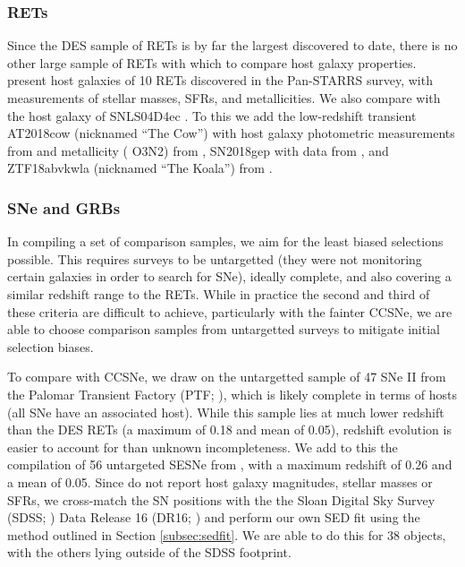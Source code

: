 \documentclass[fleqn,usenatbib,]{mnras}
\newcommand{\replychris}[1]{\color{magenta}#1 \color{black}}
\begin{document}
\subsubsection{RETs \label{subsubsec:compare_rets}}
Since the DES sample of RETs is by far the largest discovered to date, there is no other large sample of RETs with which to compare host galaxy properties. \citet{Drout2014} present host galaxies of 10 RETs discovered in the Pan-STARRS survey, with measurements of stellar masses, SFRs, and metallicities. \replychris{We also compare with the host galaxy of SNLS04D4ec \citep{Arcavi2016}.} To this we add the low-redshift transient AT2018cow (nicknamed ``The Cow'') with host galaxy photometric measurements from \citet{Perley2019} and metallicity (\citealt{Pettini2004} O3N2) from \citet{Morokuma-Matsui2019}, SN2018gep with data from  \citet{Ho2019}, and ZTF18abvkwla (nicknamed ``The Koala'') from \citet{Ho2020}.

\subsubsection{SNe and GRBs \label{subsubsec:compare_CCSNe}}

In compiling a set of comparison samples, we aim for the least biased selections possible. This requires surveys to be untargetted (they were not monitoring certain galaxies in order to search for SNe), ideally complete, and also covering a similar redshift range to the RETs. While in practice the second and third of these criteria are difficult to achieve, particularly with the fainter CCSNe, we are able to choose comparison samples from untargetted surveys to mitigate initial selection biases.

To compare with CCSNe, we draw on the untargetted sample of 47 SNe II from the Palomar Transient Factory (PTF; \citealt{Stoll2013}), which is likely complete in terms of hosts (all SNe have an associated host). While this sample lies at much lower redshift than the DES RETs (a maximum of 0.18 and mean of 0.05), redshift evolution is easier to account for than unknown incompleteness. We add to this the compilation of 56 untargeted SESNe from \citet{Sanders2012}, with a maximum redshift of 0.26 and a mean of 0.05. Since \citet{Sanders2012} do not report host galaxy magnitudes, stellar masses or SFRs, we cross-match the SN positions with the the Sloan Digital Sky Survey (SDSS; \citealt{York2000}) Data Release 16 (DR16; \citealt{Ahumada2019}) and perform our own SED fit using the method outlined in Section \ref{subsec:sedfit}. We are able to do this for 38 objects, with the others lying outside of the SDSS footprint.
\end{document}
